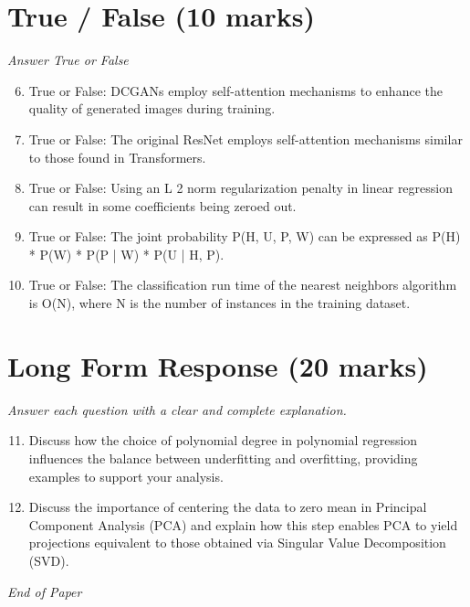 \documentclass[12pt]{article}
\begin{document}
\section*{True / False (10 marks)}
\textit{Answer True or False}
\begin{enumerate}[label=\arabic*.]
\setcounter{enumi}{5}
\item True or False: DCGANs employ self-attention mechanisms to enhance the quality of generated images during training.
\item True or False: The original ResNet employs self-attention mechanisms similar to those found in Transformers.
\item True or False: Using an L 2 norm regularization penalty in linear regression can result in some coefficients being zeroed out.
\item True or False: The joint probability P(H, U, P, W) can be expressed as P(H) * P(W) * P(P | W) * P(U | H, P).
\item True or False: The classification run time of the nearest neighbors algorithm is O(N), where N is the number of instances in the training dataset.
\end{enumerate}

\section*{Long Form Response (20 marks)}
\textit{Answer each question with a clear and complete explanation.}
\begin{enumerate}[label=\arabic*.]
\setcounter{enumi}{10}
\item Discuss how the choice of polynomial degree in polynomial regression influences the balance between underfitting and overfitting, providing examples to support your analysis.
\item Discuss the importance of centering the data to zero mean in Principal Component Analysis (PCA) and explain how this step enables PCA to yield projections equivalent to those obtained via Singular Value Decomposition (SVD).
\end{enumerate}

\vfill
\noindent\textit{End of Paper}
\end{document}
